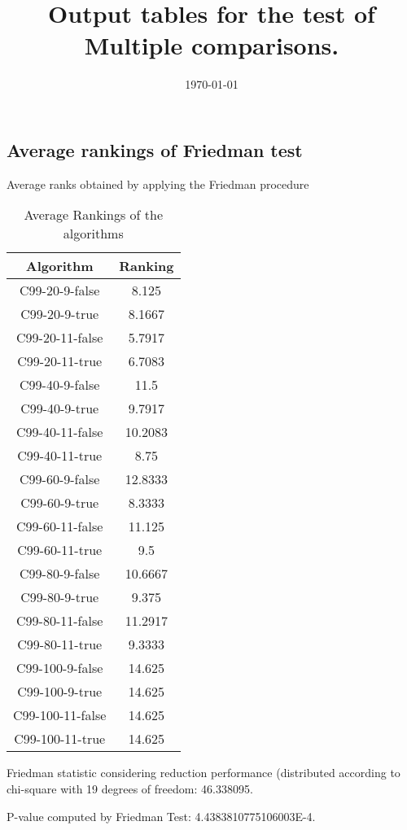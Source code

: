 \documentclass[a4paper,10pt]{article}
\title{Output tables for the test of Multiple comparisons.}
\author{}
\date{\today}
\begin{document}
\begin{landscape}
\pagestyle{empty}
\maketitle
\thispagestyle{empty}
\section{Average rankings of Friedman test}



Average ranks obtained by applying the Friedman procedure

\begin{table}[!htp]
\centering
\begin{tabular}{|c|c|}\hline
Algorithm&Ranking\\\hline
C99-20-9-false & 8.125\\
C99-20-9-true & 8.1667\\
C99-20-11-false & 5.7917\\
C99-20-11-true & 6.7083\\
C99-40-9-false & 11.5\\
C99-40-9-true & 9.7917\\
C99-40-11-false & 10.2083\\
C99-40-11-true & 8.75\\
C99-60-9-false & 12.8333\\
C99-60-9-true & 8.3333\\
C99-60-11-false & 11.125\\
C99-60-11-true & 9.5\\
C99-80-9-false & 10.6667\\
C99-80-9-true & 9.375\\
C99-80-11-false & 11.2917\\
C99-80-11-true & 9.3333\\
C99-100-9-false & 14.625\\
C99-100-9-true & 14.625\\
C99-100-11-false & 14.625\\
C99-100-11-true & 14.625\\
\hline
\end{tabular}
\caption{Average Rankings of the algorithms}
\end{table}

Friedman statistic considering reduction performance (distributed according to chi-square with 19 degrees of freedom: 46.338095.

P-value computed by Friedman Test: 4.4383810775106003E-4.\newline




\end{landscape}
\end{document}
